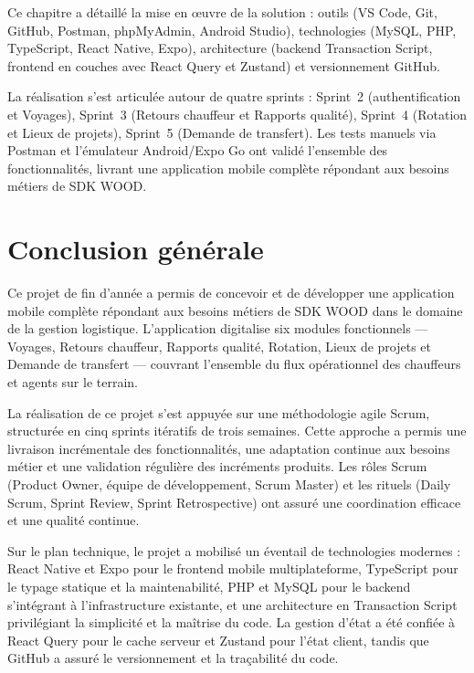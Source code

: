 \documentclass[12pt,a4paper]{article}
\begin{document}
    Ce chapitre a détaillé la mise en œuvre de la solution : outils (VS Code, Git, GitHub, Postman, phpMyAdmin, Android Studio), technologies (MySQL, PHP, TypeScript, React Native, Expo), architecture (backend Transaction Script, frontend en couches avec React Query et Zustand) et versionnement GitHub.

    La réalisation s'est articulée autour de quatre sprints : Sprint~2 (authentification et Voyages), Sprint~3 (Retours chauffeur et Rapports qualité), Sprint~4 (Rotation et Lieux de projets), Sprint~5 (Demande de transfert). Les tests manuels via Postman et l'émulateur Android/Expo Go ont validé l'ensemble des fonctionnalités, livrant une application mobile complète répondant aux besoins métiers de SDK WOOD.

    \newpage


    \section*{Conclusion générale}

    Ce projet de fin d'année a permis de concevoir et de développer une application mobile complète répondant aux besoins métiers de SDK WOOD dans le domaine de la gestion logistique. L'application digitalise six modules fonctionnels — Voyages, Retours chauffeur, Rapports qualité, Rotation, Lieux de projets et Demande de transfert — couvrant l'ensemble du flux opérationnel des chauffeurs et agents sur le terrain.

    La réalisation de ce projet s'est appuyée sur une méthodologie agile Scrum, structurée en cinq sprints itératifs de trois semaines. Cette approche a permis une livraison incrémentale des fonctionnalités, une adaptation continue aux besoins métier et une validation régulière des incréments produits. Les rôles Scrum (Product Owner, équipe de développement, Scrum Master) et les rituels (Daily Scrum, Sprint Review, Sprint Retrospective) ont assuré une coordination efficace et une qualité continue.

    Sur le plan technique, le projet a mobilisé un éventail de technologies modernes : React Native et Expo pour le frontend mobile multiplateforme, TypeScript pour le typage statique et la maintenabilité, PHP et MySQL pour le backend s'intégrant à l'infrastructure existante, et une architecture en Transaction Script privilégiant la simplicité et la maîtrise du code. La gestion d'état a été confiée à React Query pour le cache serveur et Zustand pour l'état client, tandis que GitHub a assuré le versionnement et la traçabilité du code.
\end{document}
